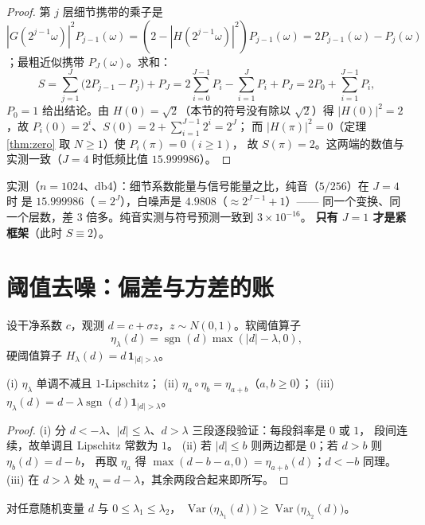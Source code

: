 \begin{proof}
第 $j$ 层细节携带的乘子是 $|G(2^{j-1}\omega)|^2P_{j-1}(\omega)=(2-|H(2^{j-1}\omega)|^2)P_{j-1}(\omega)
=2P_{j-1}(\omega)-P_j(\omega)$；最粗近似携带 $P_J(\omega)$。求和：
\[
S=\sum_{j=1}^{J}\big(2P_{j-1}-P_j\big)+P_J=2\sum_{i=0}^{J-1}P_i-\sum_{i=1}^{J}P_i+P_J
=2P_0+\sum_{i=1}^{J-1}P_i ,
\]
$P_0=1$ 给出结论。由 $H(0)=\sqrt2$（本节的符号没有除以 $\sqrt2$）得
$|H(0)|^2=2$，故 $P_i(0)=2^i$、$S(0)=2+\sum_{i=1}^{J-1}2^i=2^J$；
而 $|H(\pi)|^2=0$（定理 \ref{thm:zero} 取 $N\ge1$）使 $P_i(\pi)=0\ (i\ge1)$，
故 $S(\pi)=2$。这两端的数值与实测一致（$J=4$ 时低频比值 $15.999986$）。
\end{proof}

实测（$n=1024$、db4）：细节系数能量与信号能量之比，纯音（$5/256$）在 $J=4$ 时
是 $15.999986$（$=2^J$），白噪声是 $4.9808$（$\approx2^{J-1}+1$）——
同一个变换、同一个层数，差 3 倍多。纯音实测与符号预测一致到 $3\times10^{-16}$。
\textbf{只有 $J=1$ 才是紧框架}（此时 $S\equiv2$）。

\section{阈值去噪：偏差与方差的账}

设干净系数 $c$，观测 $d=c+\sigma z$，$z\sim N(0,1)$。软阈值算子
\[
\eta_\lambda(d)=\operatorname{sgn}(d)\max(|d|-\lambda,0),
\]
硬阈值算子 $H_\lambda(d)=d\,\mathbf{1}_{|d|>\lambda}$。

\begin{lemma}[软阈值的三条代数性质]
\label{lem:soft}
(i) $\eta_\lambda$ 单调不减且 $1$-Lipschitz；
(ii) $\eta_a\circ\eta_b=\eta_{a+b}$（$a,b\ge0$）；
(iii) $\eta_\lambda(d)=d-\lambda\operatorname{sgn}(d)\mathbf{1}_{|d|>\lambda}$。
\end{lemma}

\begin{proof}
(i) 分 $d<-\lambda$、$|d|\le\lambda$、$d>\lambda$ 三段逐段验证：每段斜率是 $0$ 或 $1$，
段间连续，故单调且 Lipschitz 常数为 $1$。
(ii) 若 $|d|\le b$ 则两边都是 $0$；若 $d>b$ 则 $\eta_b(d)=d-b$，
再取 $\eta_a$ 得 $\max(d-b-a,0)=\eta_{a+b}(d)$；$d<-b$ 同理。
(iii) 在 $d>\lambda$ 处 $\eta_\lambda=d-\lambda$，其余两段合起来即所写。
\end{proof}

\begin{theorem}[方差随阈值单调不增]
\label{thm:var-monotone}
对任意随机变量 $d$ 与 $0\le\lambda_1\le\lambda_2$，
$\operatorname{Var}\big(\eta_{\lambda_1}(d)\big)\ge\operatorname{Var}\big(\eta_{\lambda_2}(d)\big)$。
\end{theorem}

